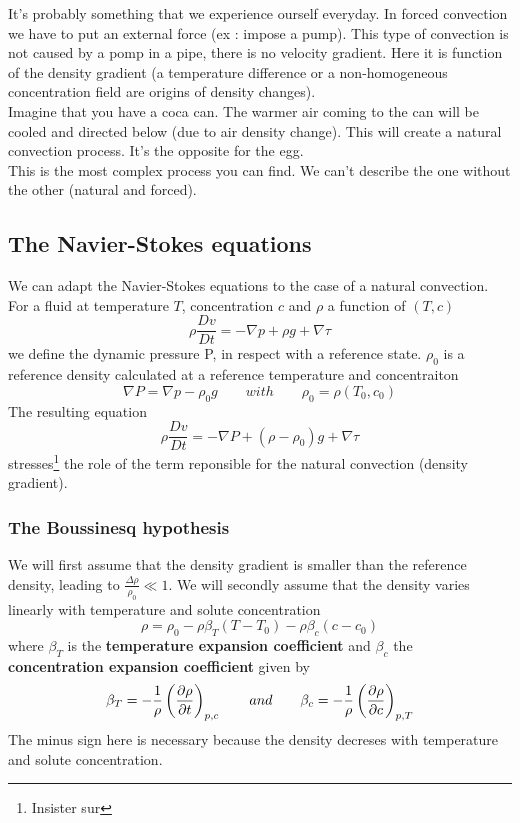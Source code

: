 		It's probably something that we experience ourself everyday. In forced convection we have to put an external force (ex : impose a pump). This type of convection is not caused by a pomp in a pipe, there is no velocity gradient. Here it is function of the density gradient (a temperature difference or a non-homogeneous concentration field are origins of density changes).\\ 
Imagine that you have a coca can. The warmer air coming to the can will be cooled and directed below (due to air density change). This will create a natural convection process. It’s the opposite for the egg. \\
This is the most complex process you can find. We can’t describe the one without the other (natural and forced).

	\subsection{The Navier-Stokes equations}
		We can adapt the Navier-Stokes equations to the case of a natural convection. For a fluid at temperature $T$, concentration $c$ and $\rho$ a function of $(T,c)$
		\begin{equation}
			\rho \frac{D v}{D t} = -\nabla p + \rho g + \nabla \tau
		\end{equation}
		we define the dynamic pressure P, in respect with a reference state. $\rho _0$ is a reference density calculated at a reference temperature and concentraiton
		\begin{equation}
			\nabla P = \nabla p - \rho _0 g \qquad with \qquad \rho _ 0 = \rho (T_0,c_0)
		\end{equation}
		The resulting equation
		\begin{equation}
			\rho \frac{D v}{D t} = -\nabla P + (\rho - \rho _0) g + \nabla \tau
		\end{equation}		 
		stresses\footnote{Insister sur} the role of the term reponsible for the natural convection (density gradient). 

		\subsubsection{The Boussinesq hypothesis}
			We will first assume that the density gradient is smaller than the reference density, leading to $\frac{\Delta \rho }{\rho _0} \ll 1$. 
			We will secondly assume that the density varies linearly with temperature and solute concentration 
			\begin{equation}
				\rho = \rho _0 - \rho \beta _T (T-T_0) - \rho \beta _c (c-c_0)
			\end{equation}
			where $\beta _T$ is the \textbf{temperature expansion coefficient} and $\beta _c$ the \textbf{concentration expansion coefficient} given by 
			\begin{equation}
				\beta _T = - \frac{1}{\rho} \left( \frac{\D \rho}{\D t} \right) _{p,c} \qquad and \qquad \beta _c = - \frac{1}{\rho} \left( \frac{\D \rho}{\D c} \right) _{p,T}
			\end{equation}
			The minus sign here is necessary because the density decreses with temperature and solute concentration. 